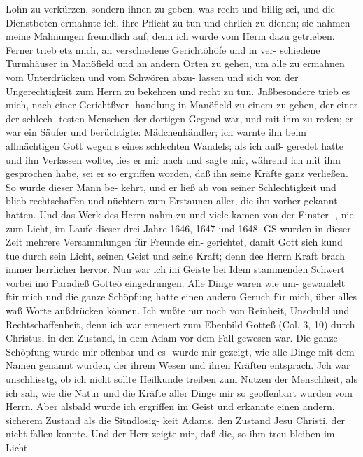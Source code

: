 Lohn zu verkürzen, sondern ihnen zu geben, was recht und billig
sei, und die Dienstboten ermahnte ich, ihre Pflicht zu tun und
ehrlich zu dienen; sie nahmen meine Mahnungen freundlich auf,
denn ich wurde vom Herm dazu getrieben.
Ferner trieb etz mich, an verschiedene Gerichtöhöfe und in ver-
schiedene Turmhäuser in Manöfield und an andern Orten zu gehen,
um alle zu ermahnen vom Unterdrücken und vom Schwören abzu-
lassen und sich von der Ungerechtigkeit zum Herrn zu bekehren und
recht zu tun. Jnßbesondere trieb es mich, nach einer Gerichtßver-
handlung in Manöfield zu einem zu gehen, der einer der schlech-
testen Menschen der dortigen Gegend war, und mit ihm zu reden;
er war ein Säufer und berüchtigte: Mädchenhändler; ich warnte ihn
beim allmächtigen Gott wegen s eines schlechten Wandels; als ich auß-
geredet hatte und ihn Verlassen wollte, lies er mir nach und sagte
mir, während ich mit ihm gesprochen habe, sei er so ergriffen worden,
daß ihn seine Kräfte ganz verließen. So wurde dieser Mann be-
kehrt, und er ließ ab von seiner Schlechtigkeit und blieb rechtschaffen
und nüchtern zum Erstaunen aller, die ihn vorher gekannt hatten.
Und das Werk des Herrn nahm zu und viele kamen von der Finster- ,
nie zum Licht, im Laufe dieser drei Jahre 1646, 1647 und 1648.
GS wurden in dieser Zeit mehrere Versammlungen für Freunde ein-
gerichtet, damit Gott sich kund tue durch sein Licht, seinen Geist
und seine Kraft; denn dee Herrn Kraft brach immer herrlicher hervor.
Nun war ich ini Geiste bei Idem stammenden Schwert vorbei
inö Paradieß Gotteö eingedrungen. Alle Dinge waren wie um-
gewandelt ftir mich und die ganze Schöpfung hatte einen andern
Geruch für mich, über alles waß Worte außdrücken können. Ich
wußte nur noch von Reinheit, Unschuld und Rechtschaffenheit, denn
ich war erneuert zum Ebenbild Gotteß (Col. 3, 10) durch Christus,
in den Zustand, in dem Adam vor dem Fall gewesen war. Die
ganze Schöpfung wurde mir offenbar und es- wurde mir gezeigt,
wie alle Dinge mit dem Namen genannt wurden, der ihrem
Wesen und ihren Kräften entsprach. Jch war unschliisstg, ob ich
nicht sollte Heilkunde treiben zum Nutzen der Menschheit, als ich
sah, wie die Natur und die Kräfte aller Dinge mir so geoffenbart
wurden vom Herrn. Aber alsbald wurde ich ergriffen im Geist
und erkannte einen andern, sicherem Zustand als die Sitndlosig-
keit Adams, den Zustand Jesu Christi, der nicht fallen konnte.
Und der Herr zeigte mir, daß die, so ihm treu bleiben im Licht


